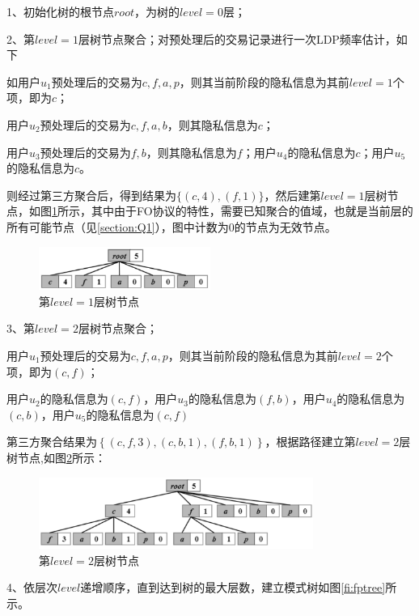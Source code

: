 \documentclass[UTF8]{ctexart}
\begin{document}
1、初始化树的根节点$root$，为树的$level=0$层；

2、第$level=1$层树节点聚合；对预处理后的交易记录进行一次LDP频率估计，如下

如用户$u_{1}$预处理后的交易为{\color{red}$c,f,a,p$}，则其当前阶段的隐私信息为其前$level=1$个项，即为$c$；

用户$u_{2}$预处理后的交易为{\color{red}$c,f,a,b$}，则其隐私信息为$c$；

用户$u_{3}$预处理后的交易为{\color{red}$f,b$}，则其隐私信息为$f$；用户$u_{4}$的隐私信息为$c$；用户$u_{5}$的隐私信息为$c$。

则经过第三方聚合后，得到结果为$\{(c,4),(f,1)\}$，然后建第$level=1$层树节点，如图\ref{figure:levelone}所示，其中由于FO协议的特性，需要已知聚合的值域，也就是当前层的所有可能节点（见\ref{section:Q1}），图中计数为0的节点为无效节点。

  \begin{figure}[h]
    \centering
    \includegraphics[width=0.5\textwidth]{level_1}
    \caption{第$level=1$层树节点}
    \label{figure:levelone}
  \end{figure}

3、第$level=2$层树节点聚合；

用户$u_{1}$预处理后的交易为{\color{red}$c,f,a,p$}，则其当前阶段的隐私信息为其前$level=2$个项，即为$(c,f)$；

用户$u_{2}$的隐私信息为$(c,f)$，用户$u_{3}$的隐私信息为$(f,b)$，用户$u_{4}$的隐私信息为$(c,b)$，用户$u_{5}$的隐私信息为$(c,f)$

第三方聚合结果为$\left \{ (c,f,3) , (c,b,1) , (f,b,1) \right \}$，根据路径建立第$level=2$层树节点,如图\ref{figure:leveltwo}所示：

  \begin{figure}[h]
    \centering
    \includegraphics[width=0.8\textwidth]{level_2}
    \caption{第$level=2$层树节点}
    \label{figure:leveltwo}
  \end{figure}

4、依层次$level$递增顺序，直到达到树的最大层数，建立模式树如图\ref{fi:fptree}所示。
\end{document}
